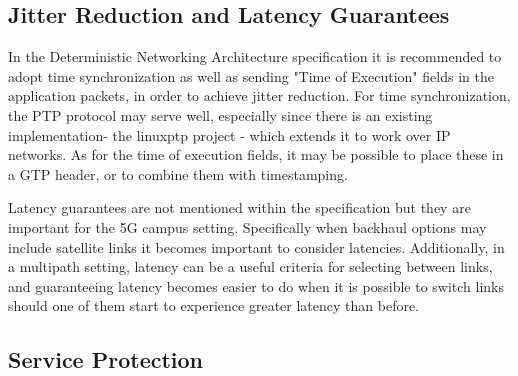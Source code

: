 \subsection{Jitter Reduction and Latency Guarantees}

In the Deterministic Networking Architecture specification it is recommended to adopt time synchronization as well as sending "Time of Execution" fields in the application packets, in order to achieve jitter reduction. For time synchronization, the PTP protocol may serve well, especially since there is an existing implementation- the linuxptp project -  which extends it to work over IP networks. As for the time of execution fields, it may be possible to place these in a GTP header, or to combine them with timestamping.

Latency guarantees are not mentioned within the specification but they are important for the 5G campus setting. Specifically when backhaul options may include satellite links it becomes important to consider latencies. Additionally, in a multipath setting, latency can be a useful criteria for selecting between links, and guaranteeing latency becomes easier to do when it is possible to switch links should one of them start to experience greater latency than before.

\subsection{Service Protection}

